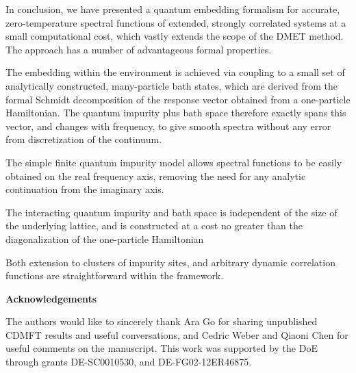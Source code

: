 \documentclass[aps,twocolumn,nobibnotes]{revtex4}
\begin{document}
In conclusion, we have presented a quantum embedding formalism for accurate, zero-temperature spectral functions of extended, strongly correlated systems 
at a small computational cost, which vastly 
extends the scope of the DMET method. The approach has a number of 
advantageous formal properties. 
\begin{inparaenum}
\item The embedding within the environment is achieved via coupling to a small set of analytically constructed, many-particle bath states,
    which are derived from the formal Schmidt decomposition of the response vector obtained from a one-particle Hamiltonian. The quantum impurity
    plus bath space therefore exactly spans this vector, and
    changes with frequency, to give smooth spectra without any error from discretization of the continuum.
\item The simple finite quantum impurity model allows spectral functions to be easily obtained on the real frequency axis, removing the 
    need for any analytic continuation from the imaginary axis.
\item The interacting quantum impurity and bath space is independent of the size of the underlying lattice, and is constructed at a cost no greater than the
    diagonalization of the one-particle Hamiltonian
\item Both extension to clusters of impurity sites, and arbitrary dynamic correlation functions are straightforward within the framework.
\end{inparaenum}

{\bf Acknowledgements}

The authors would like to sincerely thank Ara Go for sharing unpublished CDMFT results and useful 
conversations, and Cedric Weber and Qiaoni Chen for useful comments on the manuscript.
This work was supported by the DoE through grants DE-SC0010530, and DE-FG02-12ER46875.

%
\end{document}
